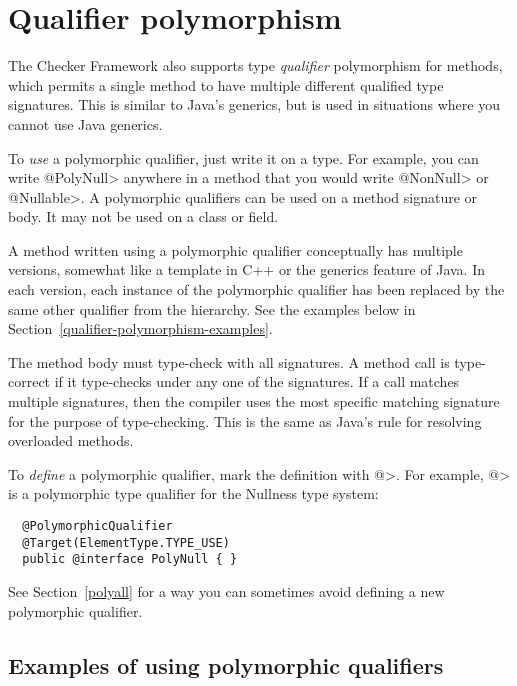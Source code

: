 \section{Qualifier polymorphism\label{qualifier-polymorphism}}

The Checker Framework also supports type \emph{qualifier} polymorphism for
methods, which permits a single method to have multiple different qualified
type signatures.  This is similar to Java's generics, but is used in
situations where you cannot use Java generics.

To \emph{use} a polymorphic qualifier, just write it on a type.
For example, you can write \<@PolyNull> anywhere in a method that you would write
\<@NonNull> or \<@Nullable>.
A polymorphic qualifiers can be used on a method signature or body.
It may not be used on a class or field.

A method written using a polymorphic qualifier conceptually has multiple
versions, somewhat like a template in C++ or the generics feature of Java.
In each version, each instance of the polymorphic qualifier has been
replaced by the same other qualifier from the hierarchy.  See the examples
below in Section~\ref{qualifier-polymorphism-examples}.

The method body must type-check with all signatures.  A method call is
type-correct if it type-checks under any one of the signatures.  If a call
matches multiple signatures, then the compiler uses the most specific
matching signature for the purpose of type-checking.  This is the same as
Java's rule for resolving overloaded methods.

To \emph{define} a polymorphic qualifier, mark the definition with
\<@>.  For example,
\<@> is a polymorphic type
qualifier for the Nullness type system:

\begin{Verbatim}
  @PolymorphicQualifier
  @Target(ElementType.TYPE_USE)
  public @interface PolyNull { }
\end{Verbatim}

\noindent
See Section~\ref{polyall} for a way you can sometimes avoid defining a new
polymorphic qualifier.


\subsection{Examples of using polymorphic qualifiers\label{qualifier-polymorphism-examples}}

